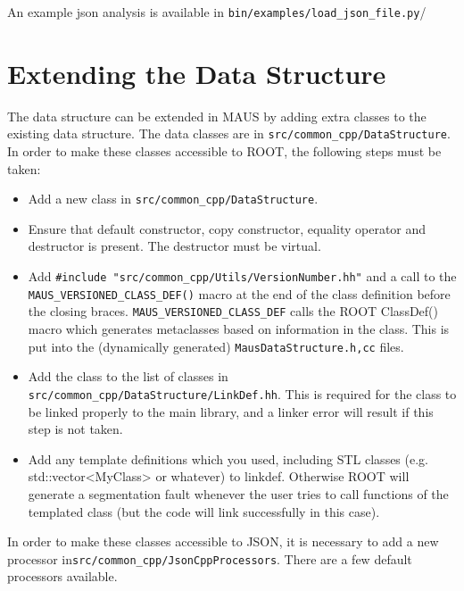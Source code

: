 An example json analysis is available in \verb|bin/examples/load_json_file.py|/

\section{Extending the Data Structure}
The data structure can be extended in MAUS by adding extra classes to the existing data structure. The data classes are in \verb|src/common_cpp/DataStructure|. In order to make these classes accessible to ROOT, the following steps must be taken:
\begin{itemize}
\item Add a new class in \verb|src/common_cpp/DataStructure|.
\item Ensure that default constructor, copy constructor, equality operator and destructor is present. The destructor must be virtual.
\item Add \verb|#include "src/common_cpp/Utils/VersionNumber.hh"| and a call to the \verb|MAUS_VERSIONED_CLASS_DEF()| macro at the end of the class definition before the closing braces. \verb|MAUS_VERSIONED_CLASS_DEF| calls the ROOT ClassDef() macro which generates metaclasses based on information in the class. This is put into the (dynamically generated) \verb|MausDataStructure.h,cc| files.
\item Add the class to the list of classes in \verb|src/common_cpp/DataStructure/LinkDef.hh|. This is required for the class to be linked properly to the main library, and a linker error will result if this step is not taken.
\item Add any template definitions which you used, including STL classes (e.g. std::vector<MyClass> or whatever) to linkdef. Otherwise ROOT will generate a segmentation fault whenever the user tries to call functions of the templated class (but the code will link successfully in this case).
\end{itemize}
In order to make these classes accessible to JSON, it is necessary to add a new processor in\linebreak\verb|src/common_cpp/JsonCppProcessors|. There are a few default processors available.
